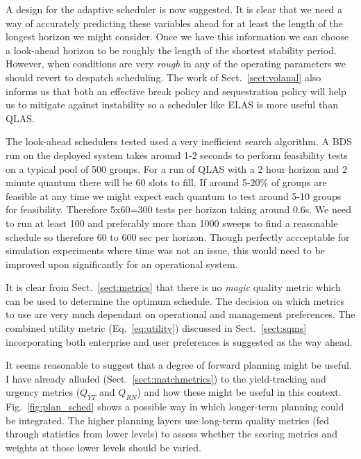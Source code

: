 A design for the adaptive scheduler is now suggested. It is clear that we need a way of accurately predicting these variables ahead for at least the length of the longest horizon we might consider. Once we have this information we can choose a look-ahead horizon to be roughly the length of the shortest stability period. However, when conditions are very \emph{rough} in any of the operating parameters we should revert to despatch scheduling. The work of Sect.~\ref{sect:volanal} also informs us that both an effective break policy and sequestration policy will help us to mitigate against instability so a scheduler like ELAS is more useful than QLAS.

The look-ahead schedulers tested used a very inefficient search algorithm. A BDS run on the deployed system takes around 1-2 seconds to perform feasibility tests on a typical pool of 500 groups. For a run of QLAS with a 2 hour horizon and 2 minute quantum there will be 60 slots to fill. If around 5-20\% of groups are feasible at any time we might expect each quantum to test around 5-10 groups for feasibility. Therefore 5x60=300 tests per horizon taking around 0.6s. We need to run at least 100 and preferably more than 1000 sweeps to find a reasonable schedule so therefore 60 to 600 sec per horizon. Though perfectly accceptable for simulation experiments where time was not an issue, this would need to be improved upon significantly for an operational system.

It is clear from Sect.~\ref{sect:metrics} that there is no \emph{magic} quality metric which can be used to determine the optimum schedule. The decision on which metrics to use are very much dependant on operational and management preferences. The combined utility metric (Eq.~\ref{eq:utility}) discussed in Sect.~\ref{sect:sqms} incorporating both enterprise and user preferences is suggested as the way ahead.

It seems reasonable to suggest that a degree of forward planning might be useful. I have already alluded (Sect.~\ref{sect:matchmetrics}) to the yield-tracking and urgency metrics ($Q_{YT}$ and $Q_{RN}$) and how these might be useful in this context. Fig.~\ref{fig:plan_sched} shows a possible way in which longer-term planning could be integrated. The higher planning layers use long-term quality metrics (fed through statistics from lower levels) to assess whether the scoring metrics and weights at those lower levels should be varied.

